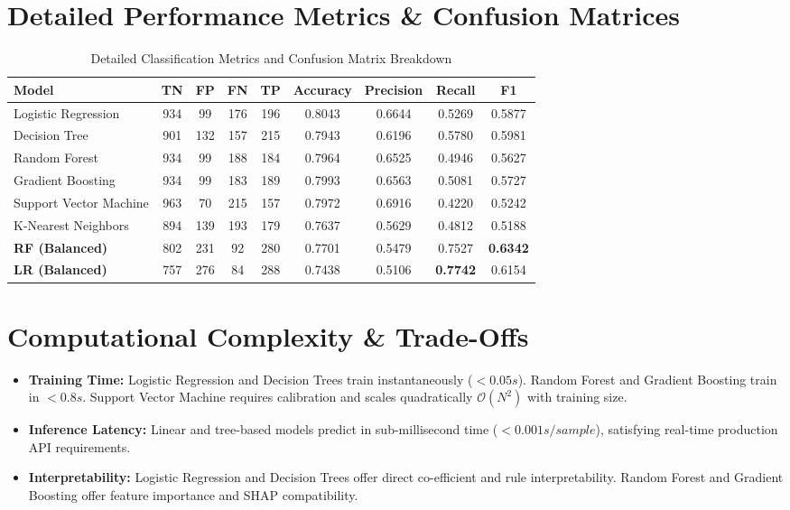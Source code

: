 \documentclass[11pt,a4paper]{article}
\begin{document}
\section{Detailed Performance Metrics & Confusion Matrices}
\begin{table}[h!]
\centering
\caption{Detailed Classification Metrics and Confusion Matrix Breakdown}
\begin{tabular}{lcccccccc}
\toprule
\textbf{Model} & \textbf{TN} & \textbf{FP} & \textbf{FN} & \textbf{TP} & \textbf{Accuracy} & \textbf{Precision} & \textbf{Recall} & \textbf{F1} \\
\midrule
Logistic Regression & 934 & 99 & 176 & 196 & 0.8043 & 0.6644 & 0.5269 & 0.5877 \\
Decision Tree & 901 & 132 & 157 & 215 & 0.7943 & 0.6196 & 0.5780 & 0.5981 \\
Random Forest & 934 & 99 & 188 & 184 & 0.7964 & 0.6525 & 0.4946 & 0.5627 \\
Gradient Boosting & 934 & 99 & 183 & 189 & 0.7993 & 0.6563 & 0.5081 & 0.5727 \\
Support Vector Machine & 963 & 70 & 215 & 157 & 0.7972 & 0.6916 & 0.4220 & 0.5242 \\
K-Nearest Neighbors & 894 & 139 & 193 & 179 & 0.7637 & 0.5629 & 0.4812 & 0.5188 \\
\midrule
\textbf{RF (Balanced)} & 802 & 231 & 92 & 280 & 0.7701 & 0.5479 & 0.7527 & \textbf{0.6342} \\
\textbf{LR (Balanced)} & 757 & 276 & 84 & 288 & 0.7438 & 0.5106 & \textbf{0.7742} & 0.6154 \\
\bottomrule
\end{tabular}
\end{table}

\section{Computational Complexity & Trade-Offs}
\begin{itemize}
    \item \textbf{Training Time:} Logistic Regression and Decision Trees train instantaneously ($<0.05s$). Random Forest and Gradient Boosting train in $<0.8s$. Support Vector Machine requires calibration and scales quadratically $\mathcal{O}(N^2)$ with training size.
    \item \textbf{Inference Latency:} Linear and tree-based models predict in sub-millisecond time ($<0.001s/sample$), satisfying real-time production API requirements.
    \item \textbf{Interpretability:} Logistic Regression and Decision Trees offer direct co-efficient and rule interpretability. Random Forest and Gradient Boosting offer feature importance and SHAP compatibility.
\end{itemize}
\end{document}
